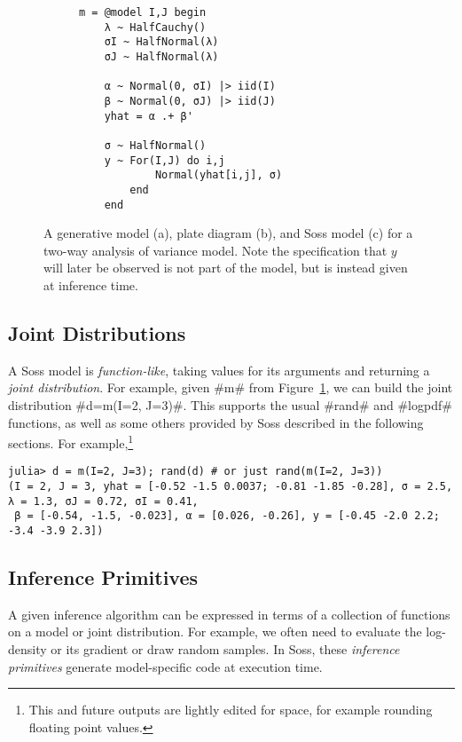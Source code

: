 \documentclass[anonymous=false, %
               format=acmsmall, %
               review=false, %
               screen=true, %
               nonacm=true]{acmart}
\begin{document}
\begin{figure}[t]
\begin{subfigure}[b]{0.3\textwidth}
    \begin{verbatim}
m = @model I,J begin
    λ ~ HalfCauchy()
    σI ~ HalfNormal(λ)
    σJ ~ HalfNormal(λ)
     
    α ~ Normal(0, σI) |> iid(I)
    β ~ Normal(0, σJ) |> iid(J)
    yhat = α .+ β'

    σ ~ HalfNormal()
    y ~ For(I,J) do i,j 
            Normal(yhat[i,j], σ)
        end
    end
    \end{verbatim} 
    \caption{}
    \end{subfigure}

    \caption{A generative model (a), plate diagram (b), and Soss model (c) for a two-way analysis of variance model. Note the specification that $y$ will later be observed is not part of the model, but is instead given at inference time.}
    \label{fig:model}
\end{figure}

\subsection{Joint Distributions}

A Soss model is \emph{function-like}, taking values for its arguments and returning a \emph{joint distribution}. For example, given \jl#m# from Figure~\ref{fig:model}, we can build the joint distribution \jl#d=m(I=2, J=3)#. This supports the usual \jl#rand# and \jl#logpdf# functions, as well as some others provided by Soss described in the following sections. For example,\footnote{This and future outputs are lightly edited for space, for example rounding floating point values.}

\begin{verbatim}
julia> d = m(I=2, J=3); rand(d) # or just rand(m(I=2, J=3))
(I = 2, J = 3, yhat = [-0.52 -1.5 0.0037; -0.81 -1.85 -0.28], σ = 2.5, λ = 1.3, σJ = 0.72, σI = 0.41, 
 β = [-0.54, -1.5, -0.023], α = [0.026, -0.26], y = [-0.45 -2.0 2.2; -3.4 -3.9 2.3])
\end{verbatim}

\subsection{Inference Primitives}

A given inference algorithm can be expressed in terms of a collection of functions on a model or joint distribution. For example, we often need to evaluate the log-density or its gradient  or draw random samples. In Soss, these \emph{inference primitives} generate model-specific code at execution time.
\end{document}
